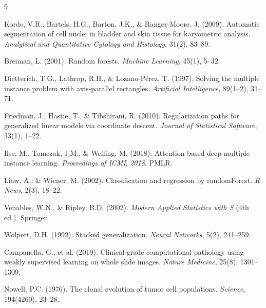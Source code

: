 \documentclass[12pt, onecolumn]{article}
\begin{document}
\clearpage
{}
\begin{thebibliography}{9}
\small

Korde, V.R., Bartels, H.G., Barton, J.K., \& Ranger-Moore, J. (2009).
Automatic segmentation of cell nuclei in bladder and skin tissue
for karyometric analysis.
\textit{Analytical and Quantitative Cytology and Histology},
31(2), 83--89.

Breiman, L. (2001).
Random forests.
\textit{Machine Learning}, 45(1), 5--32.

Dietterich, T.G., Lathrop, R.H., \& Lozano-P{\'e}rez, T. (1997).
Solving the multiple instance problem with axis-parallel rectangles.
\textit{Artificial Intelligence}, 89(1--2), 31--71.

Friedman, J., Hastie, T., \& Tibshirani, R. (2010).
Regularization paths for generalized linear models via coordinate
descent.
\textit{Journal of Statistical Software}, 33(1), 1--22.

Ilse, M., Tomczak, J.M., \& Welling, M. (2018).
Attention-based deep multiple instance learning.
\textit{Proceedings of ICML 2018}. PMLR.

Liaw, A., \& Wiener, M. (2002).
Classification and regression by randomForest.
\textit{R News}, 2(3), 18--22.

Venables, W.N., \& Ripley, B.D. (2002).
\textit{Modern Applied Statistics with S} (4th ed.). Springer.

Wolpert, D.H. (1992).
Stacked generalization.
\textit{Neural Networks}, 5(2), 241--259.

Campanella, G., et al. (2019). Clinical-grade computational pathology using weakly supervised learning on whole slide images.
\textit{Nature Medicine}, 25(8), 1301--1309.

Nowell, P.C. (1976).
The clonal evolution of tumor cell populations.
\textit{Science}, 194(4260), 23--28.

\end{thebibliography}

\clearpage
\setcounter{section}{0}
\renewcommand{\thesection}{S\arabic{section}}
\renewcommand{\thesubsection}{S\arabic{section}.\arabic{subsection}}
\end{document}
